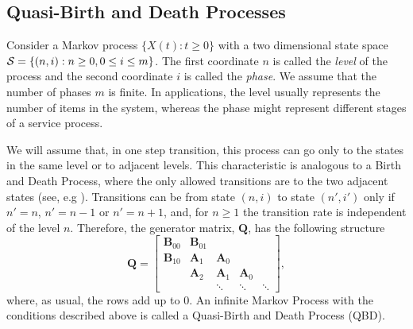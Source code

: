 \documentclass[11pt,letterpaper]{article}
\newcommand{\bA}{{\mathbf A}}
\newcommand{\bB}{{\mathbf B}}
\newcommand{\bQ}{{\mathbf Q}}
\newcommand{\cS}{{\cal S}}
\begin{document}
\subsection{Quasi-Birth and Death Processes}
\label{sec:QuasiBirthAndDeathProcesses}


Consider a Markov process $\{X(t):t\geq0\}$ with a two dimensional state space $\cS=\{(n,i):n \geq 0, 0\leq i\leq m \}$. The first coordinate $n$ is called the \emph{level} of the process and the second coordinate $i$ is called the \emph{phase}. We assume that the number of phases $m$ is finite. In applications, the level usually represents the number of items in the system, whereas the phase might represent different stages of a service process.

We will assume that, in one step transition, this process can go only to the states in the same level or to adjacent levels. This characteristic is analogous to a Birth and Death Process, where the only allowed transitions are to the two adjacent states (see, e.g \cite{kulk95}). Transitions can be from state $(n,i)$ to state $(n',i')$ only if $n' = n$, $n'=n-1$ or $n'=n+1$, and, for $n\ge 1$ the transition rate is independent of the level $n$. Therefore, the generator matrix, $\bQ$, has the following structure
\begin{equation*}\label{eq:QBDMatrix}
\bQ=
        \begin{bmatrix}
          \bB_{00}& \bB_{01}&             &             &  \\
          \bB_{10}& \bA_1& \bA_0&             &  \\
                        & \bA_2& \bA_1& \bA_0&  \\
                        &             & \ddots      & \ddots      & \ddots
        \end{bmatrix},
\end{equation*}
where, as usual, the rows add up to 0. An infinite Markov Process with the conditions described above is called a Quasi-Birth and Death Process (QBD).
\end{document}
